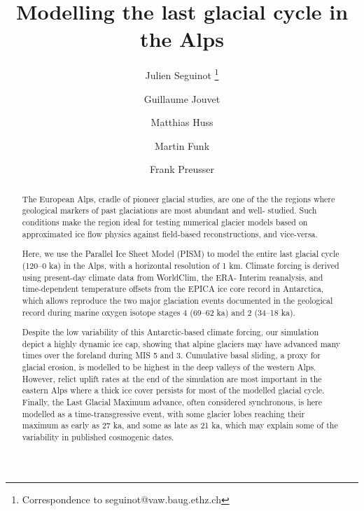 \documentclass{article}
\title{Modelling the last glacial cycle in the Alps}
\author[1]{Julien Seguinot%
           \thanks{Correspondence to seguinot@vaw.baug.ethz.ch}}
\author[1]{Guillaume Jouvet}
\author[1]{Matthias Huss}
\author[1]{Martin Funk}
\author[2]{Frank Preusser}
\affil[1]{Laboratory of Hydraulics, Hydrology and Glaciology,
          ETH Zürich, Switzerland}
\affil[2]{Institute of Earth and Environmental Sciences,
          University of Freiburg, Germany}
\begin{document}

\maketitle

\begin{abstract}

    The European Alps, cradle of pioneer glacial studies, are one of the the
    regions where geological markers of past glaciations are most abundant and
    well- studied. Such conditions make the region ideal for testing numerical
    glacier models based on approximated ice flow physics against field-based
    reconstructions, and vice-versa.

    Here, we use the Parallel Ice Sheet Model (PISM) to model the entire last
    glacial cycle (120–0 ka) in the Alps, with a horizontal resolution of 1 km.
    Climate forcing is derived using present-day climate data from WorldClim,
    the ERA- Interim reanalysis, and time-dependent temperature offsets from
    the EPICA ice core record in Antarctica, which allows reproduce the two
    major glaciation events documented in the geological record during marine
    oxygen isotope stages 4 (69–62 ka) and 2 (34–18 ka).

    Despite the low variability of this Antarctic-based climate forcing, our
    simulation depict a highly dynamic ice cap, showing that alpine glaciers
    may have advanced many times over the foreland during MIS 5 and 3.
    Cumulative basal sliding, a proxy for glacial erosion, is modelled to be
    highest in the deep valleys of the western Alps. However, relict uplift
    rates at the end of the simulation are most important in the eastern Alps
    where a thick ice cover persists for most of the modelled glacial cycle.
    Finally, the Last Glacial Maximum advance, often considered synchronous, is
    here modelled as a time-transgressive event, with some glacier lobes
    reaching their maximum as early as 27 ka, and some as late as 21 ka, which
    may explain some of the variability in published cosmogenic dates.

\end{abstract}

\end{document}
